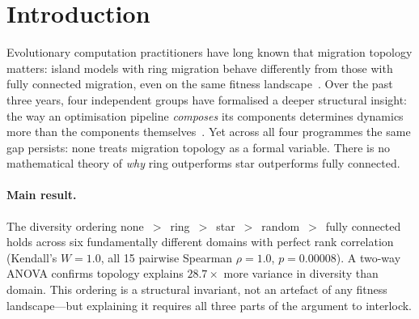 \documentclass[submission,copyright,creativecommons]{eptcs}
\begin{document}
\section{Introduction}
\label{sec:intro}

Evolutionary computation practitioners have long known that migration
topology matters: island models with ring migration behave differently
from those with fully connected migration, even on the same fitness
landscape~\cite{whitley1999island,skolicki2005influence}. Over the past
three years, four independent groups have formalised a deeper structural
insight: the way an optimisation pipeline \emph{composes} its components
determines dynamics more than the components
themselves~\cite{gavranovic2024categorical,hedges2024reinforcement,bakirtzis2024compositional,zhang2024mce}.
Yet across all four programmes the same gap persists: none treats
migration topology as a formal variable. There is no mathematical theory
of \emph{why} ring outperforms star outperforms fully connected.

\paragraph{Main result.}
The diversity ordering
none~$>$~ring~$>$~star~$>$~random~$>$~fully connected holds across
six fundamentally different domains with perfect rank correlation
(Kendall's $W = 1.0$, all 15 pairwise Spearman $\rho = 1.0$,
$p = 0.00008$). A two-way ANOVA confirms topology explains
$28.7\times$ more variance in diversity than domain. This ordering is
a structural invariant, not an artefact of any fitness landscape---but
explaining it requires all three parts of the argument to interlock.
\end{document}
